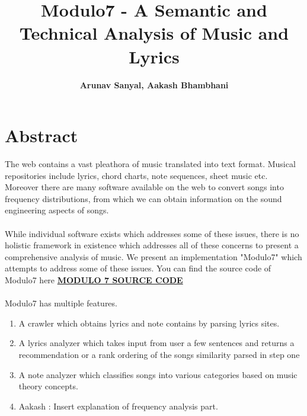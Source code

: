 \documentclass[letterpaper, 11pt]{article}
\begin{document}
\title{Modulo7 - A Semantic and Technical Analysis of Music and Lyrics
\\} 
\author{\textbf{Arunav Sanyal, Aakash Bhambhani}}
\maketitle

\section*{Abstract}
The web contains a vast pleathora of music translated into text format. Musical repositories include lyrics, chord charts, note sequences, sheet music etc. Moreover there are many software available on the web to convert songs into frequency distributions, from which we can obtain information on the sound engineering aspects of songs.\\\\
While individual software exists which addresses some of these issues, there is no holistic framework in existence which addresses all of these concerns to present a comprehensive analysis of music. We present an implementation "Modulo7" which attempts to address some of these issues. You can find the source code of Modulo7 here \href{https://github.com/Khalian/Modulo7}{\textbf{MODULO 7 SOURCE CODE}}
 \\\\
Modulo7 has multiple features. 
\begin{enumerate}
\item A crawler which obtains lyrics and note contains by parsing lyrics sites.
\item A lyrics analyzer which takes input from user a few sentences and returns a recommendation or a rank ordering of the songs similarity parsed in step one 
\item A note analyzer which classifies songs into various categories based on music theory concepts.
\item Aakash : Insert explanation of frequency analysis part. 
\end{enumerate} 
\end{document}
